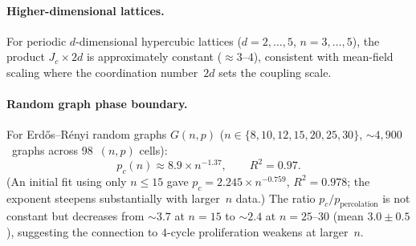\documentclass[11pt]{article}
\theoremstyle{definition}
\theoremstyle{remark}
\begin{document}
\paragraph{Higher-dimensional lattices.}
For periodic $d$-dimensional hypercubic lattices ($d = 2, \ldots, 5$,
$n = 3, \ldots, 5$), the product $J_c \times 2d$ is approximately constant
($\approx 3$--$4$), consistent with mean-field scaling where the coordination
number~$2d$ sets the coupling scale.

\paragraph{Random graph phase boundary.}
For Erd\H{o}s--R\'{e}nyi random graphs $G(n,p)$
($n \in \{8, 10, 12, 15, 20, 25, 30\}$, ${\sim}4{,}900$~graphs across
98~$(n,p)$ cells):
\begin{equation}
  p_c(n) \approx 8.9 \times n^{-1.37}, \qquad R^2 = 0.97.
  \label{eq:random-phase}
\end{equation}
(An initial fit using only $n \leq 15$ gave $p_c = 2.245 \times n^{-0.759}$,
$R^2 = 0.978$; the exponent steepens substantially with larger~$n$ data.)
The ratio $p_c / p_{\mathrm{percolation}}$ is not constant but decreases
from ${\sim}3.7$ at $n = 15$ to ${\sim}2.4$ at $n = 25$--$30$
(mean $3.0 \pm 0.5$), suggesting the connection to $4$-cycle proliferation
weakens at larger~$n$.
\end{document}
